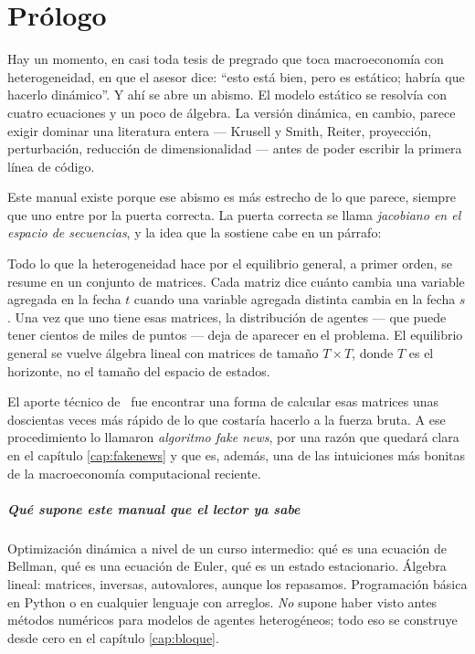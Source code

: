 \chapter*{Prólogo}

Hay un momento, en casi toda tesis de pregrado que toca macroeconomía con
heterogeneidad, en que el asesor dice: ``esto está bien, pero es estático;
habría que hacerlo dinámico''. Y ahí se abre un abismo. El modelo estático se
resolvía con cuatro ecuaciones y un poco de álgebra. La versión dinámica, en
cambio, parece exigir dominar una literatura entera --- Krusell y Smith, Reiter,
proyección, perturbación, reducción de dimensionalidad --- antes de poder
escribir la primera línea de código.

Este manual existe porque ese abismo es más estrecho de lo que parece, siempre
que uno entre por la puerta correcta. La puerta correcta se llama \emph{jacobiano
en el espacio de secuencias}, y la idea que la sostiene cabe en un párrafo:

\begin{idea}
Todo lo que la heterogeneidad hace por el equilibrio general, a primer orden,
se resume en un conjunto de matrices. Cada matriz dice cuánto cambia una
variable agregada en la fecha $t$ cuando una variable agregada distinta cambia
en la fecha $s$. Una vez que uno tiene esas matrices, la distribución de agentes
--- que puede tener cientos de miles de puntos --- deja de aparecer en el
problema. El equilibrio general se vuelve álgebra lineal con matrices de tamaño
$T\times T$, donde $T$ es el horizonte, no el tamaño del espacio de estados.
\end{idea}

El aporte técnico de \ABRS\ fue encontrar una forma de calcular esas matrices
unas doscientas veces más rápido de lo que costaría hacerlo a la fuerza bruta.
A ese procedimiento lo llamaron \emph{algoritmo fake news}, por una razón que
quedará clara en el capítulo \ref{cap:fakenews} y que es, además, una de las
intuiciones más bonitas de la macroeconomía computacional reciente.

\paragraph{Qué supone este manual que el lector ya sabe}
Optimización dinámica a nivel de un curso intermedio: qué es una ecuación de
Bellman, qué es una ecuación de Euler, qué es un estado estacionario. Álgebra
lineal: matrices, inversas, autovalores, aunque los repasamos. Programación
básica en Python o en cualquier lenguaje con arreglos. \emph{No} supone haber
visto antes métodos numéricos para modelos de agentes heterogéneos; todo eso se
construye desde cero en el capítulo \ref{cap:bloque}.

